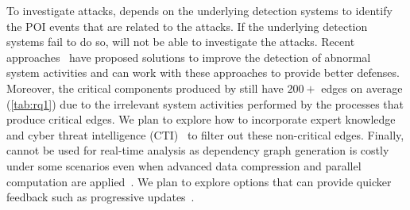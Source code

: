 To investigate attacks, \tool depends on the underlying detection systems to identify the POI events that are related to the attacks.
If the underlying detection systems fail to do so, \tool will not be able to investigate the attacks. 
Recent approaches~\cite{han2020unicorn,processanomaly2} have proposed solutions to improve the detection of abnormal system activities and \tool can work with these approaches to provide better defenses. 
Moreover, the critical components produced by \tool still have $200+$ edges on average (\ie \cref{tab:rq1}) due to the irrelevant system activities performed by the processes that produce critical edges. 
We plan to explore how to incorporate expert knowledge~\cite{aptrace} and cyber threat intelligence (CTI)~\cite{gao2021system} to filter out these non-critical edges.
Finally, \tool cannot be used for real-time analysis as dependency graph generation is costly under some scenarios even when advanced data compression and parallel computation are applied~\cite{reduction,reduction2,reduction3}. 
We plan to explore options that can provide quicker feedback such as progressive updates~\cite{aptrace,prosql}.








